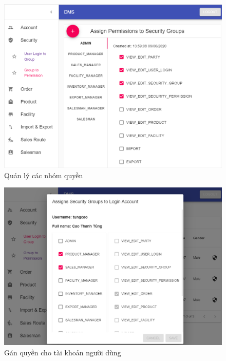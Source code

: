\begin{figure}[H]
\centering
\includegraphics[width=15cm]{images/demo/group-to-permission.png}
\caption{Quản lý các nhóm quyền}
\end{figure}

\begin{figure}[H]
\centering
\includegraphics[width=15cm]{images/demo/user-login-to-group.png}
\caption{Gán quyền cho tài khoản người dùng}
\end{figure}

